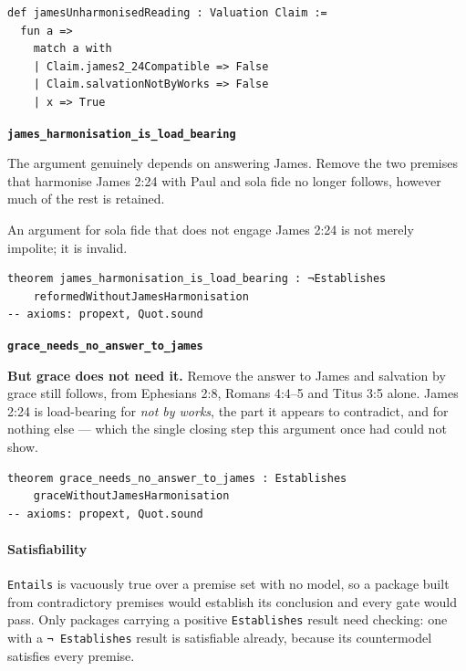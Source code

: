 \documentclass[11pt]{article}
\begin{document}
{\small\begin{verbatim}
def jamesUnharmonisedReading : Valuation Claim :=
  fun a =>
    match a with
    | Claim.james2_24Compatible => False
    | Claim.salvationNotByWorks => False
    | x => True
\end{verbatim}}
\par\medskip\noindent\textbf{\texttt{james\_\allowbreak{}harmonisation\_\allowbreak{}is\_\allowbreak{}load\_\allowbreak{}bearing}}\par\nobreak\noindent
The argument genuinely depends on answering James. Remove the two premises that harmonise James 2:24 with Paul and sola fide no longer follows, however much of the rest is retained.

An argument for sola fide that does not engage James 2:24 is not merely impolite; it is invalid.

{\small\begin{verbatim}
theorem james_harmonisation_is_load_bearing : ¬Establishes
    reformedWithoutJamesHarmonisation
-- axioms: propext, Quot.sound
\end{verbatim}}
\par\medskip\noindent\textbf{\texttt{grace\_\allowbreak{}needs\_\allowbreak{}no\_\allowbreak{}answer\_\allowbreak{}to\_\allowbreak{}james}}\par\nobreak\noindent
\textbf{But grace does not need it.} Remove the answer to James and salvation by grace still follows, from Ephesians 2:8, Romans 4:4–5 and Titus 3:5 alone. James 2:24 is load-bearing for \emph{not by works}, the part it appears to contradict, and for nothing else — which the single closing step this argument once had could not show.

{\small\begin{verbatim}
theorem grace_needs_no_answer_to_james : Establishes
    graceWithoutJamesHarmonisation
-- axioms: propext, Quot.sound
\end{verbatim}}
\paragraph*{Satisfiability}
\leavevmode\par
\texttt{Entails} is vacuously true over a premise set with no model, so a package built from contradictory premises would establish its conclusion and every gate would pass. Only packages carrying a positive \texttt{Establishes} result need checking: one with a \texttt{¬ Establishes} result is satisfiable already, because its countermodel satisfies every premise.
\end{document}
